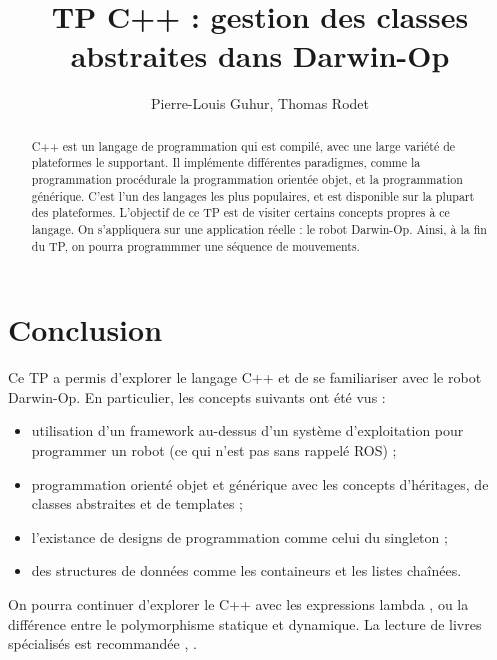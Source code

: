 \documentclass[abstracton]{scrartcl}
\title{TP C++ : gestion des classes abstraites dans Darwin-Op}
\author{Pierre-Louis Guhur,      Thomas Rodet}
\newcommand*{\rootPath}{./}
\begin{document}
\maketitle

\begin{abstract}
C++ est un langage de programmation qui est compilé, avec une large variété de plateformes le supportant.
Il implémente différentes paradigmes, comme la programmation procédurale  la programmation orientée objet, et la programmation générique.
C'est l'un des langages les plus populaires, et est disponible sur la plupart des plateformes.
L'objectif de ce TP est de visiter certains concepts propres à ce langage.
On s'appliquera sur une application réelle : le robot Darwin-Op.
Ainsi, à la fin du TP, on pourra programmmer une séquence de mouvements.
\end{abstract}










\section{Conclusion}
\label{sec:ccl}


Ce TP a permis d'explorer le langage C++ et de se familiariser avec le robot Darwin-Op. En particulier, les concepts suivants ont été vus :
\begin{itemize}
    \item utilisation d'un framework au-dessus d'un système d'exploitation pour programmer un robot (ce qui n'est pas sans rappelé ROS) ;
    \item programmation orienté objet et générique avec les concepts d'héritages, de classes abstraites et de templates ;
    \item l'existance de designs de programmation comme celui du singleton ;
    \item des structures de données comme les containeurs et les listes chaînées.
\end{itemize}
On pourra continuer d'explorer le C++ avec les expressions lambda \cite{lambda}, ou la différence entre le polymorphisme statique et dynamique. La lecture de livres spécialisés est recommandée \cite{gamma1995design}, \cite{jumpingallain}.




\ifstandalone

    \appendix
    \printglossary[title=Vocabulaire et abbréviations]
	
	
\fi
\end{document}
